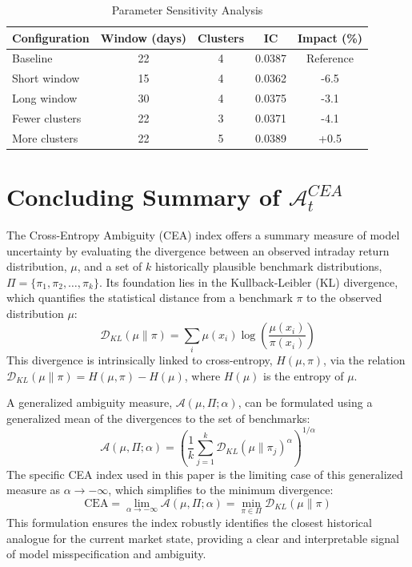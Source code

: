 \documentclass[preprint,12pt,authoryear]{elsarticle}
\begin{document}
\begin{table}[h]
\centering
\caption{Parameter Sensitivity Analysis}
\begin{tabularx}{\textwidth}{lcccc}
\toprule
\textbf{Configuration} & \textbf{Window (days)} & \textbf{Clusters} & \textbf{IC} & \textbf{Impact (\%)} \\
\midrule
Baseline & 22 & 4 & 0.0387 & Reference \\
Short window & 15 & 4 & 0.0362 & -6.5 \\
Long window & 30 & 4 & 0.0375 & -3.1 \\
Fewer clusters & 22 & 3 & 0.0371 & -4.1 \\
More clusters & 22 & 5 & 0.0389 & +0.5 \\
\bottomrule
\end{tabularx}
\end{table}

\section{Concluding Summary of $\mathcal{A}^{CEA}_t$}
The Cross-Entropy Ambiguity (CEA) index offers a summary measure of model uncertainty by evaluating the divergence between an observed intraday return distribution, $\mu$, and a set of $k$ historically plausible benchmark distributions, $\Pi = \{\pi_1, \pi_2, \dots, \pi_k\}$. Its foundation lies in the Kullback-Leibler (KL) divergence, which quantifies the statistical distance from a benchmark $\pi$ to the observed distribution $\mu$:
\begin{equation}
    \mathcal{D}_{KL}(\mu \| \pi) = \sum_{i} \mu(x_i) \log\left(\frac{\mu(x_i)}{\pi(x_i)}\right)
\end{equation}
This divergence is intrinsically linked to cross-entropy, $H(\mu, \pi)$, via the relation $\mathcal{D}_{KL}(\mu \| \pi) = H(\mu, \pi) - H(\mu)$, where $H(\mu)$ is the entropy of $\mu$.

A generalized ambiguity measure, $\mathcal{A}(\mu, \Pi; \alpha)$, can be formulated using a generalized mean of the divergences to the set of benchmarks:
\begin{equation}
    \mathcal{A}(\mu, \Pi; \alpha) = \left( \frac{1}{k} \sum_{j=1}^{k} \mathcal{D}_{KL}(\mu \| \pi_j)^{\alpha} \right)^{1/\alpha}
\end{equation}
The specific CEA index used in this paper is the limiting case of this generalized measure as $\alpha \to -\infty$, which simplifies to the minimum divergence:
\begin{equation}
    \text{CEA} = \lim_{\alpha \to -\infty} \mathcal{A}(\mu, \Pi; \alpha) = \min_{\pi \in \Pi} \mathcal{D}_{KL}(\mu \| \pi)
\end{equation}
This formulation ensures the index robustly identifies the closest historical analogue for the current market state, providing a clear and interpretable signal of model misspecification and ambiguity.
\end{document}
